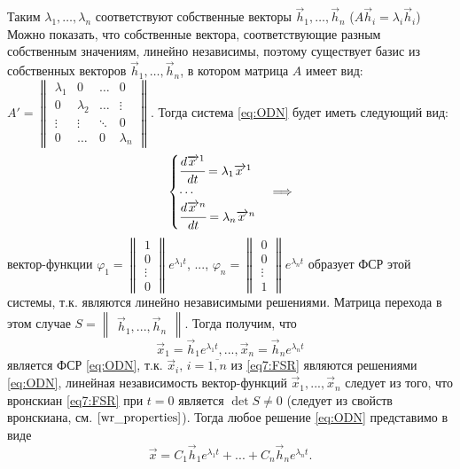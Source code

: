 Таким $\lambda_1, \dots, \lambda_n$ соответствуют собственные векторы $\overrightarrow{h}_1, \dots, \overrightarrow{h}_n$ ($A \overrightarrow{h}_i = \lambda_i \overrightarrow{h}_i$)
Можно показать, что собственные вектора, соответствующие разным собственным значениям, линейно независимы, 
поэтому существует базис из собственных векторов $\overrightarrow{h}_1, \dots, \overrightarrow{h}_n$, в котором матрица $A$ имеет вид: 
$A' = \begin{Vmatrix} 
    \lambda_1 & 0 & \ldots & 0 \\ 
    0 & \lambda_2 & \ldots & \vdots \\  
    \vdots& \vdots & \ddots &  0 \\ 
    0 & \ldots & 0 & \lambda_n 
\end{Vmatrix}$.
Тогда система \eqref{eq:ODN} будет иметь следующий вид: 
\[ \begin{cases}
    \cfrac{d \overrightarrow{x\,}^1}{dt} = \lambda_1 \overrightarrow{x \,}^1 \\
    \cdots \\
    \cfrac{d \overrightarrow{x \,}^n}{dt} = \lambda_n \overrightarrow{x \,}^n
\end{cases} \Longrightarrow \]
вектор-функции $\varphi_1 = \begin{Vmatrix*} 1 \\ 0 \\ \vdots \\ 0 \end{Vmatrix*} e^{\lambda_1 t}$, ..., 
$\varphi_n = \begin{Vmatrix*} 0 \\ 0 \\ \vdots \\ 1 \end{Vmatrix*} e^{\lambda_n t}$ 
образует ФСР этой системы, т.к. являются линейно независимыми решениями.
Матрица перехода в этом случае $S = \begin{Vmatrix*} \overrightarrow{h}_1,  ...,  \overrightarrow{h}_n \end{Vmatrix*}$. 
Тогда получим, что
\begin{equation}
    \overrightarrow{x}_1 = \overrightarrow{h}_1 e^{\lambda_1 t}, ..., \overrightarrow{x}_n = \overrightarrow{h}_n e^{\lambda_n t} \label{eq7:FSR}
\end{equation} является ФСР \eqref{eq:ODN}, т.к. $\overrightarrow{x}_i, \,i= \overline{1, n}$ из \eqref{eq7:FSR} являются решениями \eqref{eq:ODN}, 
линейная независимость вектор-функций $\overrightarrow{x}_1, ..., \overrightarrow{x}_n$ следует из того, что вронскиан \eqref{eq7:FSR} при $t=0$ является $\det S \neq 0$ (следует из свойств вронскиана, см. $\eqref{wr_properties}$).
Тогда любое решение \eqref{eq:ODN} представимо в виде
\begin{equation}
    \overrightarrow{x} = C_1 \overrightarrow{h}_1 e^{\lambda_1 t} + ... + C_n \overrightarrow{h}_n e^{\lambda_n t}.
\end{equation}

